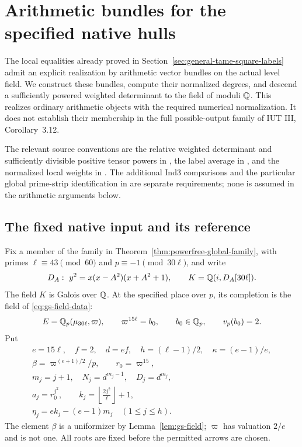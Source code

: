 \section{Arithmetic bundles for the specified native hulls}
\label{sec:uniform-arithmetic-bundles}

The local equalities already proved in
Section~\ref{sec:general-tame-square-labels} admit an explicit realization
by arithmetic vector bundles on the actual level field. We construct
these bundles, compute their normalized degrees, and descend a
sufficiently powered weighted determinant to the field of moduli
$\mathbb Q$. This realizes ordinary arithmetic objects with the required
numerical normalization. It does not establish their membership in
the full possible-output family of IUT III, Corollary~3.12.

The relevant source conventions are the relative weighted determinant
and sufficiently divisible positive tensor powers in
\cite[Remark~3.9.5(vii)(Ob3)]{IUT3}, the label average in
\cite[Proposition~3.9(i)--(iii)]{IUT3}, and the normalized local
weights in \cite[Proposition~1.4(i), Remark~1.7.1]{IUT4}.
The additional Ind3 comparisons and the particular global
prime-strip identification in
\cite[Theorem~3.11(ii), Corollary~3.12]{IUT3} are separate requirements;
none is assumed in the arithmetic arguments below.

\subsection{The fixed native input and its reference}

Fix a member of the family in
Theorem~\ref{thm:powerfree-global-family}, with primes
$\ell\equiv43\pmod{60}$ and $p\equiv-1\pmod{30\ell}$, and write
\[
 D_A:\ y^2=x(x-A^2)(x+A^2+1),\qquad
 K=\Q(i,D_A[30\ell]).
\]
The field $K$ is Galois over $\mathbb Q$. At the specified place over $p$,
its completion is the field of \eqref{eq:gs-field-data}:
\[
 E=\mathbb Q_p(\mu_{30\ell},\varpi),\qquad
 \varpi^{15\ell}=b_0,\qquad
 b_0\in\mathbb Q_p,\qquad v_p(b_0)=2.
\]
Put
\begin{equation}\label{eq:ub-parameters}
 \begin{gathered}
 e=15\ell,\quad f=2,\quad d=ef,\quad
 h=(\ell-1)/2,\quad \kappa=(e-1)/e,\\
 \beta=\varpi^{(e+1)/2}/p,\qquad r_0=\varpi^{15},\\
 m_j=j+1,\quad N_j=d^{m_j-1},\quad D_j=d^{m_j},\\
 a_j=r_0^{j^2},\qquad
 k_j=\left\lfloor\frac{2j^2}{\ell}\right\rfloor+1,\\
 \eta_j=e k_j-(e-1)m_j\quad(1\le j\le h).
 \end{gathered}
\end{equation}
The element $\beta$ is a uniformizer by Lemma~\ref{lem:gs-field};
$\varpi$ has valuation $2/e$ and is not one. All roots are fixed
before the permitted arrows are chosen.

